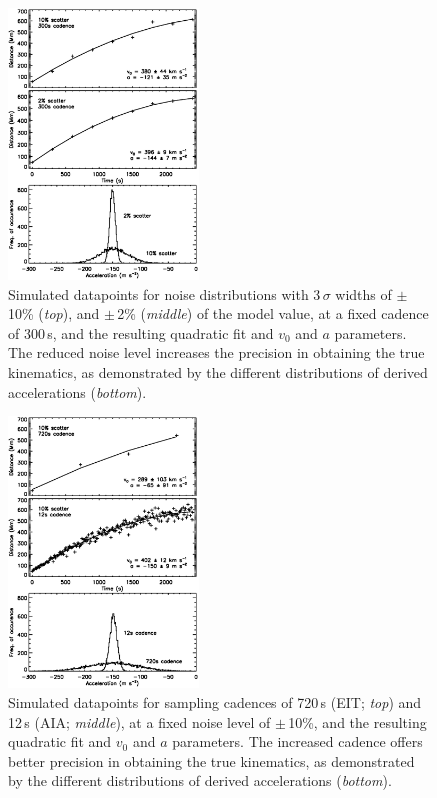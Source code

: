 \documentclass[structabstract]{aa}
\begin{document}
\begin{figure}[t]
\begin{center}
\includegraphics[width = 0.45\textwidth]{images/noise_hist_weight.eps}
\caption{Simulated datapoints for noise distributions with 3\,$\sigma$ widths of $\pm$\,10\% (\emph{top}), and $\pm$\,2\% (\emph{middle}) of the model value, at a fixed cadence of 300\,s, and the resulting quadratic fit and $v_0$ and $a$ parameters. The reduced noise level increases the precision in obtaining the true kinematics, as demonstrated by the different distributions of derived accelerations (\emph{bottom}).}
\label{noise_hist_weight}
\end{center}
\end{figure}

\begin{figure}[t]
\begin{center}
\includegraphics[width = 0.45\textwidth]{images/cad_hist_weight.eps}
\caption{Simulated datapoints for sampling cadences of 720\,s (EIT; \emph{top}) and 12\,s (AIA; \emph{middle}), at a fixed noise level of $\pm$\,10\%, and the resulting quadratic fit and $v_0$ and $a$ parameters. The increased cadence offers better precision in obtaining the true kinematics, as demonstrated by the different distributions of derived accelerations (\emph{bottom}).}
\label{cad_hist_weight}
\end{center}
\end{figure}
\end{document}
